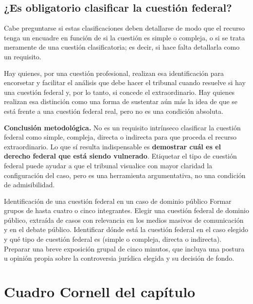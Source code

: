 \documentclass[12pt,oneside]{book}
\begin{document}
\subsection{¿Es obligatorio clasificar la cuestión federal?}

Cabe preguntarse si estas clasificaciones deben detallarse de modo que el recurso tenga un encuadre en función de si la cuestión es simple o compleja, o si se trata meramente de una cuestión clasificatoria; es decir, si hace falta detallarla como un requisito.

Hay quienes, por una cuestión profesional, realizan esa identificación para encorsetar y facilitar el análisis que debe hacer el tribunal cuando resuelve si hay una cuestión federal y, por lo tanto, si concede el extraordinario. Hay quienes realizan esa distinción como una forma de sustentar aún más la idea de que se está frente a una cuestión federal real, pero no es una condición absoluta.

\begin{important}
\textbf{Conclusión metodológica.} No es un requisito intrínseco clasificar la cuestión federal como simple, compleja, directa o indirecta para que proceda el recurso extraordinario. Lo que sí resulta indispensable es \textbf{demostrar cuál es el derecho federal que está siendo vulnerado}. Etiquetar el tipo de cuestión federal puede ayudar a que el tribunal visualice con mayor claridad la configuración del caso, pero es una herramienta argumentativa, no una condición de admisibilidad.
\end{important}

\begin{exercise}{Identificación de una cuestión federal en un caso de dominio público}
Formar grupos de hasta cuatro o cinco integrantes. Elegir una cuestión federal de dominio público, extraída de casos con relevancia en los medios masivos de comunicación y en el debate público. Identificar dónde está la cuestión federal en el caso elegido y qué tipo de cuestión federal es (simple o compleja, directa o indirecta). Preparar una breve exposición grupal de cinco minutos, que incluya una postura u opinión propia sobre la controversia jurídica elegida y su decisión de fondo.
\end{exercise}

\section{Cuadro Cornell del capítulo}
\end{document}
